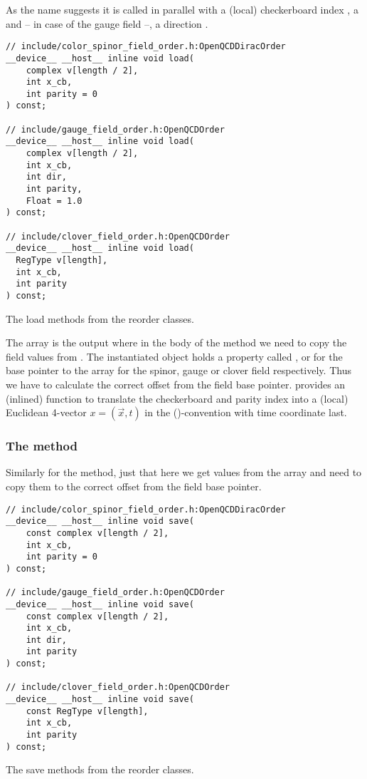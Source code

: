 As the name suggests it is called in parallel with a (local) checkerboard index , a  and -- in case of the gauge field --, a direction .
\begin{codelisting}
\begin{verbatim}
// include/color_spinor_field_order.h:OpenQCDDiracOrder
__device__ __host__ inline void load(
    complex v[length / 2],
    int x_cb,
    int parity = 0
) const;

// include/gauge_field_order.h:OpenQCDOrder
__device__ __host__ inline void load(
    complex v[length / 2],
    int x_cb,
    int dir,
    int parity,
    Float = 1.0
) const;

// include/clover_field_order.h:OpenQCDOrder
__device__ __host__ inline void load(
  RegType v[length],
  int x_cb,
  int parity
) const;
\end{verbatim}
\caption{The load methods from the reorder classes.}
\label{lst:interface:load}
\end{codelisting}
The array  is the output where in the body of the method we need to copy the field values from \openqxd. The instantiated object holds a property called ,  or  for the base pointer to the \openqxd array for the spinor, gauge or clover field respectively. Thus we have to calculate the correct offset from the field base pointer. \Quda provides an (inlined) function  to translate the checkerboard and parity index into a (local) Euclidean 4-vector $x = (\vec{x}, t)$ in the (\xyzt)-convention with time coordinate last.

\subsubsection{The  method}

Similarly for the  method, just that here we get values from the  array and need to copy them to the correct offset from the field base pointer.
\begin{codelisting}
\begin{verbatim}
// include/color_spinor_field_order.h:OpenQCDDiracOrder
__device__ __host__ inline void save(
    const complex v[length / 2],
    int x_cb,
    int parity = 0
) const;

// include/gauge_field_order.h:OpenQCDOrder
__device__ __host__ inline void save(
    const complex v[length / 2],
    int x_cb,
    int dir,
    int parity
) const;

// include/clover_field_order.h:OpenQCDOrder
__device__ __host__ inline void save(
    const RegType v[length],
    int x_cb,
    int parity
) const;
\end{verbatim}
\caption{The save methods from the reorder classes.}
\label{lst:interface:save}
\end{codelisting}

